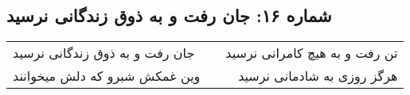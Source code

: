 \begin{center}
\section*{شماره ۱۶: جان رفت و به ذوق زندگانی نرسید}
\label{sec:016}
\begin{longtable}{l p{0.5cm} r}
جان رفت و به ذوق زندگانی نرسید
&&
تن رفت و به هیچ کامرانی نرسید
\\
وین غمکش شبرو که دلش میخوانند
&&
هرگز روزی به شادمانی نرسید
\\
\end{longtable}
\end{center}

